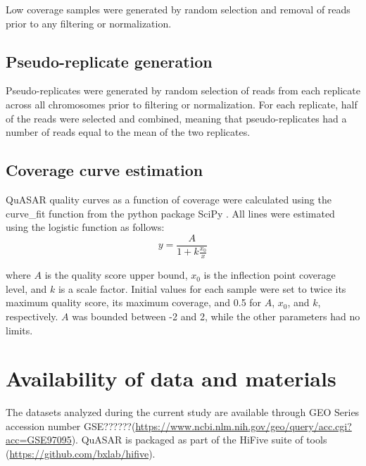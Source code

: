 Low coverage samples were generated by random selection and removal of reads prior to any filtering or normalization.

\subsection{Pseudo-replicate generation}

Pseudo-replicates were generated by random selection of reads from each replicate across all chromosomes prior to filtering or normalization. For each replicate, half of the reads were selected and combined, meaning that pseudo-replicates had a number of reads equal to the mean of the two replicates.

\subsection{Coverage curve estimation}

QuASAR quality curves as a function of coverage were calculated using the curve\_fit function from the python package SciPy \cite{walt_numpy_2011}. All lines were estimated using the logistic function as follows:
\[y=\frac{A}{1+k\frac{x_0}{x}}\]

where $A$ is the quality score upper bound, $x_0$ is the inflection point coverage level, and $k$ is a scale factor. Initial values for each sample were set to twice its maximum quality score, its maximum coverage, and 0.5 for $A$, $x_0$, and $k$, respectively. $A$ was bounded between -2 and 2, while the other parameters had no limits.

\section{Availability of data and materials}

The datasets analyzed during the current study are available through GEO Series accession number GSE??????(\url{https://www.ncbi.nlm.nih.gov/geo/query/acc.cgi?acc=GSE97095}). QuASAR is packaged as part of the HiFive suite of tools (\url{https://github.com/bxlab/hifive}).

\printbibliography

\clearpage
